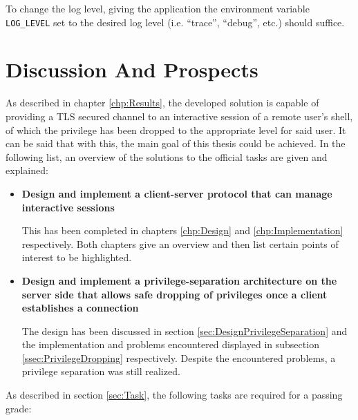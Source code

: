 \documentclass[10pt,a4paper,titlepage,twoside,english,final]{zhawreprt}
\begin{document}
To change the log level, giving the application the environment variable \texttt{LOG\_LEVEL} set to the desired log level (i.e. ``trace'', ``debug'', etc.) should suffice.

\chapter{Discussion And Prospects}\label{chp:DiscussionAndProspects}
As described in chapter \ref{chp:Results}, the developed solution is capable of providing a \gls{TLS} secured channel to an interactive session of a remote user's \gls{shell}, of which the privilege has been dropped to the appropriate level for said user.
It can be said that with this, the main goal of this thesis could be achieved.
In the following list, an overview of the solutions to the official tasks are given and explained:
\begin{itemize}
\item \textbf{Design and implement a client-server protocol that can manage interactive sessions}

This has been completed in chapters \ref{chp:Design} and \ref{chp:Implementation} respectively.
Both chapters give an overview and then list certain points of interest to be highlighted.

\item \textbf{Design and implement a privilege-separation architecture on the server side that allows safe dropping of privileges once a client establishes a connection}

The design has been discussed in section \ref{sec:DesignPrivilegeSeparation} and the implementation and problems encountered displayed in subsection \ref{ssec:PrivilegeDropping} respectively.
Despite the encountered problems, a privilege separation was still realized.
\end{itemize}

As described in section \ref{sec:Task}, the following tasks are required for a passing grade:
\end{document}
